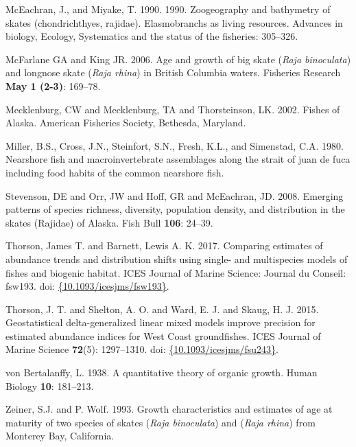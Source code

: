 \documentclass[12pt,]{article}
\begin{document}
\leavevmode\hypertarget{ref-McEachran1990}{}%
McEachran, J., and Miyake, T. 1990. 1990. Zoogeography and bathymetry of
skates (chondrichthyes, rajidae). Elasmobranchs as living resources.
Advances in biology, Ecology, Systematics and the status of the
fisheries: 305--326.

\leavevmode\hypertarget{ref-McFandKing2006}{}%
McFarlane GA and King JR. 2006. Age and growth of big skate (\emph{Raja
binoculata}) and longnose skate (\emph{Raja rhina}) in British Columbia
waters. Fisheries Research \textbf{May 1 (2-3)}: 169--78.

\leavevmode\hypertarget{ref-Mecklenburg2002}{}%
Mecklenburg, CW and Mecklenburg, TA and Thorsteinson, LK. 2002. Fishes
of Alaska. American Fisheries Society, Bethesda, Maryland.

\leavevmode\hypertarget{ref-Miller1980}{}%
Miller, B.S., Cross, J.N., Steinfort, S.N., Fresh, K.L., and Simenstad,
C.A. 1980. Nearshore fish and macroinvertebrate assemblages along the
strait of juan de fuca including food habits of the common nearshore
fish.

\leavevmode\hypertarget{ref-Stevenson2008}{}%
Stevenson, DE and Orr, JW and Hoff, GR and McEachran, JD. 2008. Emerging
patterns of species richness, diversity, population density, and
distribution in the skates (Rajidae) of Alaska. Fish Bull \textbf{106}:
24--39.

\leavevmode\hypertarget{ref-Thorson2017a}{}%
Thorson, James T. and Barnett, Lewis A. K. 2017. Comparing estimates of
abundance trends and distribution shifts using single- and multispecies
models of fishes and biogenic habitat. ICES Journal of Marine Science:
Journal du Conseil: fsw193. doi:
\href{https://doi.org/\%7B10.1093/icesjms/fsw193\%7D}{\{10.1093/icesjms/fsw193\}}.

\leavevmode\hypertarget{ref-Thorson2015}{}%
Thorson, J. T. and Shelton, A. O. and Ward, E. J. and Skaug, H. J. 2015.
Geostatistical delta-generalized linear mixed models improve precision
for estimated abundance indices for West Coast groundfishes. ICES
Journal of Marine Science \textbf{72}(5): 1297--1310. doi:
\href{https://doi.org/\%7B10.1093/icesjms/fsu243\%7D}{\{10.1093/icesjms/fsu243\}}.

\leavevmode\hypertarget{ref-VonB}{}%
von Bertalanffy, L. 1938. A quantitative theory of organic growth. Human
Biology \textbf{10}: 181--213.

\leavevmode\hypertarget{ref-ZeinerWolf1993}{}%
Zeiner, S.J. and P. Wolf. 1993. Growth characteristics and estimates of
age at maturity of two species of skates (\emph{Raja binoculata}) and
(\emph{Raja rhina}) from Monterey Bay, California.
\end{document}
